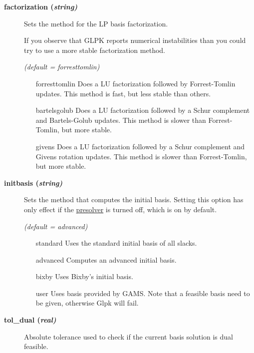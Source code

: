 \begin{description}
\item[\label{factorization}\hypertarget{factorization}
{\textbf{factorization (\slshape{string})}}]\hspace{1.0in}

Sets the method for the LP basis factorization.

If you observe that GLPK reports numerical instabilities than you could try to use a more stable factorization method.

\textsl{(default = forresttomlin)}
\begin{itemize}
\item[forresttomlin] 
Does a LU factorization followed by Forrest-Tomlin updates.
This method is fast, but less stable than others.
\item[bartelsgolub] 
Does a LU factorization followed by a Schur complement and Bartels-Golub updates.
This method is slower than Forrest-Tomlin, but more stable.
\item[givens] 
Does a LU factorization followed by a Schur complement and Givens rotation updates.
This method is slower than Forrest-Tomlin, but more stable.
\end{itemize}

\item[\label{initbasis}\hypertarget{initbasis}
{\textbf{initbasis (\slshape{string})}}]\hspace{1.0in}

Sets the method that computes the initial basis.
Setting this option has only effect if the \hyperlink{presolve}{presolver} is turned off, which is on by default.

\textsl{(default = advanced)}
\begin{itemize}
\item[standard] 
Uses the standard initial basis of all slacks.
\item[advanced] 
Computes an advanced initial basis.
\item[bixby] 
Uses Bixby's initial basis.
\item[user] 
Uses basis provided by GAMS.
Note that a feasible basis need to be given, otherwise Glpk will fail.
\end{itemize}

\item[\label{glpktol_dual}\hypertarget{glpktol_dual}
{\textbf{tol\_dual (\slshape{real})}}]\hspace{1.0in}

Absolute tolerance used to check if the current basis solution is dual feasible.


\end{description}
